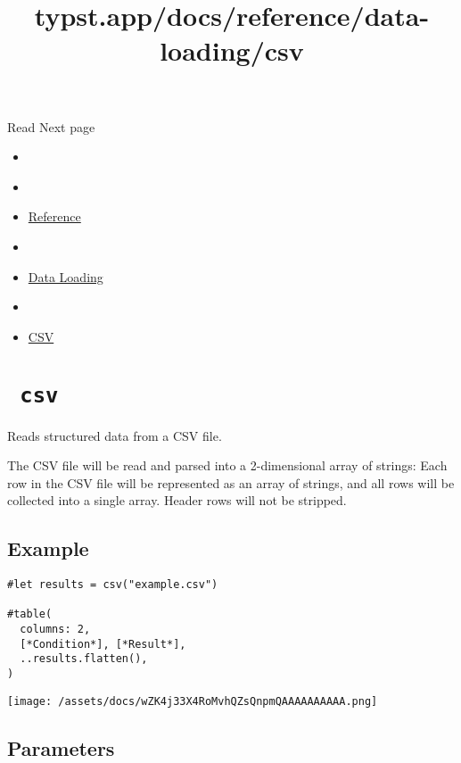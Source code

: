 { Read } { Next page }


\title{typst.app/docs/reference/data-loading/csv}

\begin{itemize}
\tightlist
\item
  \href{/docs}{}
\item
  
\item
  \href{/docs/reference/}{Reference}
\item
  
\item
  \href{/docs/reference/data-loading/}{Data Loading}
\item
  
\item
  \href{/docs/reference/data-loading/csv/}{CSV}
\end{itemize}

\section{\texorpdfstring{\texttt{\ csv\ }}{ csv }}\label{summary}

Reads structured data from a CSV file.

The CSV file will be read and parsed into a 2-dimensional array of
strings: Each row in the CSV file will be represented as an array of
strings, and all rows will be collected into a single array. Header rows
will not be stripped.

\subsection{Example}\label{example}

\begin{verbatim}
#let results = csv("example.csv")

#table(
  columns: 2,
  [*Condition*], [*Result*],
  ..results.flatten(),
)
\end{verbatim}

\texttt{[image: /assets/docs/wZK4j33X4RoMvhQZsQnpmQAAAAAAAAAA.png]}

\subsection{\texorpdfstring{{ Parameters
}}{ Parameters }}\label{parameters}

